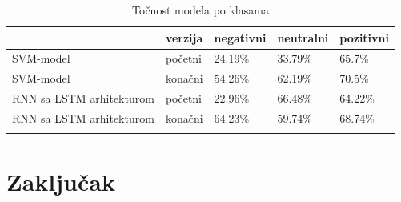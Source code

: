 \documentclass[times, utf8, zavrsni]{fer}
\begin{document}
\begin{table}
\centering
\begin{tabular}{|l|l|l|l|l|} 
\hline
				& verzija &negativni               &neutralni               &pozitivni            \\ 
\hline
SVM-model &  početni & 24.19\% &  33.79\% & 65.7\% \\
\hline
SVM-model & konačni & 54.26\% & 62.19\% & 70.5\% \\ 
\hline
RNN sa LSTM arhitekturom &početni & 22.96\% &66.48\%&64.22\%  \\ 
\hline
RNN sa LSTM arhitekturom &konačni & 64.23\%&59.74\%&68.74\%  \\ 
\hline
\multicolumn{1}{l}{}  & \multicolumn{1}{l}{} & \multicolumn{1}{l}{} & \multicolumn{1}{l}{}  & \multicolumn{1}{l}{} 
\end{tabular}
\caption{Točnost modela po klasama }
\label{pocetakkraj}
\end{table}

\chapter{Zaključak}
\end{document}
